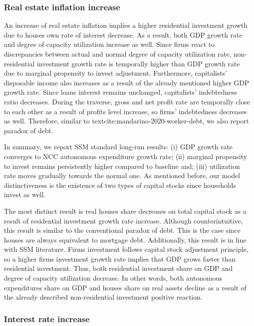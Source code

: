 \documentclass[12pt]{article}
\begin{document}
\subsubsection{Real estate inflation increase}
\label{sec:org2b1e1fc}
\label{sec:Exp2}


An increase of real estate inflation implies a higher residential investment growth due to houses own rate of interest decrease.
As a result, both GDP growth rate and degree of capacity utilization increase as well.
Since firms react to discrepancies between actual and normal degree of capacity utilization rate, non-residential investment growth rate 
is temporally higher than GDP growth rate due to marginal propensity to invest adjustment.
Furthermore, capitalists' disposable income also increases as a result of the already mentioned higher GDP growth rate.
Since loans interest remains unchanged, capitalists' indebtedness ratio decreases.
During the traverse, gross and net profit rate are temporally close to each other as a result of profits level increase, so firms' indebtedness decreases as well.
Therefore, similar to textcite:mandarino-2020-worker-debt, we also report paradox of debt.

In summary, we report SSM standard long-run results:
    (i) GDP growth rate converges to NCC autonomous expenditure growth rate;
    (ii) marginal propensity to invest remains persistently higher compared to baseline and;
    (iii) utilization rate moves gradually towards the normal one.
As mentioned before, our model distinctiveness is the existence of two types of capital stocks since households invest as well.


The most distinct result is real houses share decreases on total capital stock as a result of residential investment growth rate increase.
Although counterintuitive, this result is similar to the conventional paradox of debt.
This is the case since houses are always equivalent to  mortgage debt.
Additionally, this result is in line with SSM literature.
Firms investment follows capital stock adjustment principle, so a higher firms investment growth rate implies that
GDP grows faster than residential investment.
Thus, both residential investment share on GDP and degree of capacity  utilization decrease.
In other words, both autonomous expenditures share on GDP and houses share on real assets decline as a result of the already described non-residential investment positive reaction.
\subsubsection{Interest rate increase}
\label{sec:org02827fe}
\label{sec:Exp3}
\end{document}

